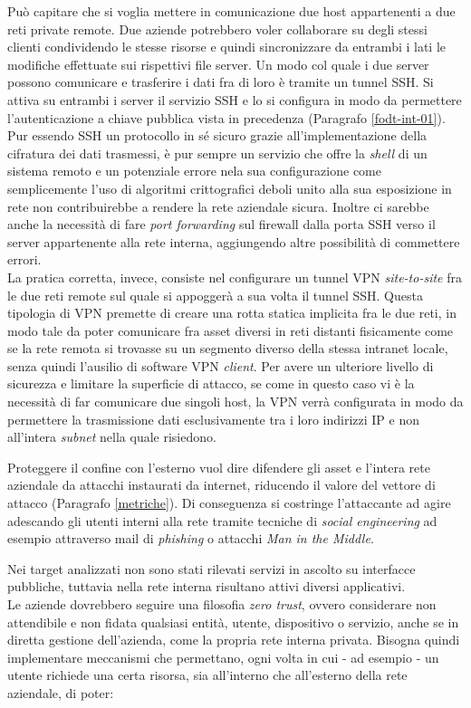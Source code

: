 \documentclass[target=bach,aauheader=]{thud}
\begin{document}
Può capitare che si voglia mettere in comunicazione due host appartenenti a due reti private remote. Due aziende potrebbero voler collaborare su degli stessi clienti condividendo le stesse risorse e quindi sincronizzare da entrambi i lati le modifiche effettuate sui rispettivi file server. Un modo col quale i due server possono comunicare e trasferire i dati fra di loro è tramite un tunnel SSH. Si attiva su entrambi i server il servizio SSH e lo si configura in modo da permettere l'autenticazione a chiave pubblica vista in precedenza (Paragrafo \ref{fodt-int-01}). Pur essendo SSH un protocollo in sé sicuro grazie all'implementazione della cifratura dei dati trasmessi, è pur sempre un servizio che offre la \textit{shell} di un sistema remoto e un potenziale errore nela sua configurazione come semplicemente l'uso di algoritmi crittografici deboli unito alla sua esposizione in rete non contribuirebbe a rendere la rete aziendale sicura. Inoltre ci sarebbe anche la necessità di fare \textit{port forwarding} sul firewall dalla porta SSH verso il server appartenente alla rete interna, aggiungendo altre possibilità di commettere errori.
\\ La pratica corretta, invece, consiste nel configurare un tunnel VPN \textit{site-to-site} fra le due reti remote sul quale si appoggerà a sua volta il tunnel SSH. Questa tipologia di VPN premette di creare una rotta statica implicita fra le due reti, in modo tale da poter comunicare fra asset diversi in reti distanti fisicamente come se la rete remota si trovasse su un segmento diverso della stessa intranet locale, senza quindi l'ausilio di software VPN \textit{client}. Per avere un ulteriore livello di sicurezza e limitare la superficie di attacco, se come in questo caso vi è la necessità di far comunicare due singoli host, la VPN verrà configurata in modo da permettere la trasmissione dati esclusivamente tra i loro indirizzi IP e non all'intera \textit{subnet} nella quale risiedono.

Proteggere il confine con l'esterno vuol dire difendere gli asset e l'intera rete aziendale da attacchi instaurati da internet, riducendo il valore del vettore di attacco (Paragrafo \ref{metriche}). Di conseguenza si costringe l'attaccante ad agire adescando gli utenti interni alla rete tramite tecniche di \textit{social engineering} ad esempio attraverso mail di \textit{phishing} o attacchi \textit{Man in the Middle}.

Nei target analizzati non sono stati rilevati servizi in ascolto su interfacce pubbliche, tuttavia nella rete interna risultano attivi diversi applicativi.
\\Le aziende dovrebbero seguire una filosofia \textit{zero trust}, ovvero considerare non attendibile e non fidata qualsiasi entità, utente, dispositivo o servizio, anche se in diretta gestione dell'azienda, come la propria rete interna privata. Bisogna quindi implementare meccanismi che permettano, ogni volta in cui - ad esempio - un utente richiede una certa risorsa, sia all'interno che all'esterno della rete aziendale, di poter:
\end{document}

